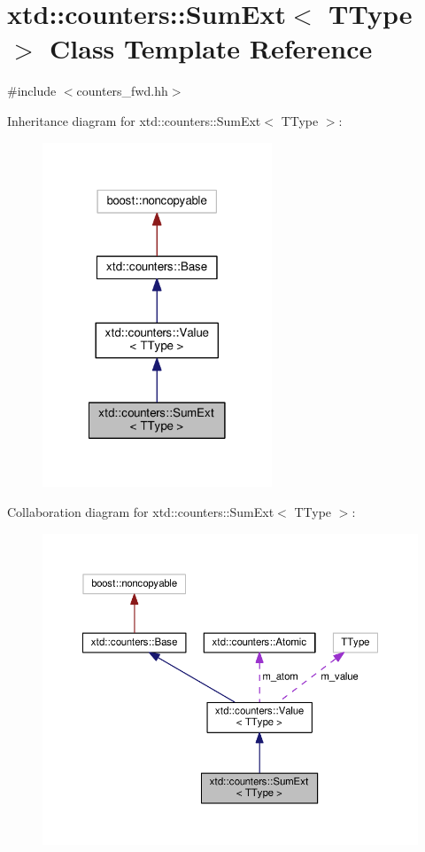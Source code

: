 \hypertarget{classxtd_1_1counters_1_1SumExt}{\section{xtd\-:\-:counters\-:\-:Sum\-Ext$<$ T\-Type $>$ Class Template Reference}
\label{classxtd_1_1counters_1_1SumExt}
}


{\ttfamily \#include $<$counters\-\_\-fwd.\-hh$>$}



Inheritance diagram for xtd\-:\-:counters\-:\-:Sum\-Ext$<$ T\-Type $>$\-:
\nopagebreak
\begin{figure}[H]
\begin{center}
\leavevmode
\includegraphics[width=194pt]{classxtd_1_1counters_1_1SumExt__inherit__graph}
\end{center}
\end{figure}


Collaboration diagram for xtd\-:\-:counters\-:\-:Sum\-Ext$<$ T\-Type $>$\-:
\nopagebreak
\begin{figure}[H]
\begin{center}
\leavevmode
\includegraphics[width=350pt]{classxtd_1_1counters_1_1SumExt__coll__graph}
\end{center}
\end{figure}
